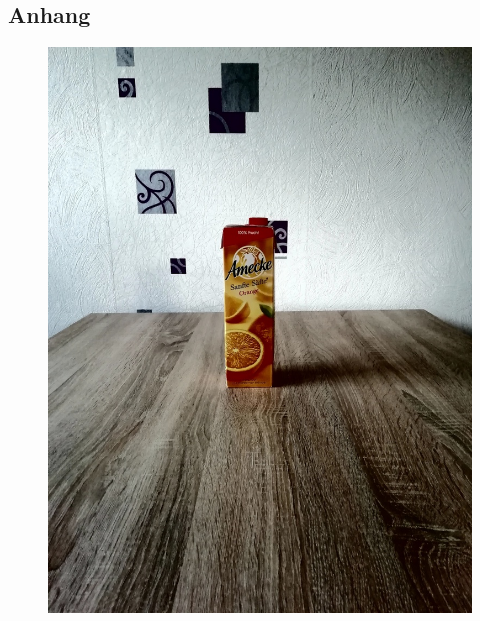 \begin{appendices}
\part*{Anhang}
\begin{figure}[htb]
\begin{minipage}[c]{0.2\textwidth}
\includegraphics[width=\textwidth]{Sources/Bild1_HA.jpg}
\end{minipage}
\hfill
\begin{minipage}[c]{0.08\textwidth}

\end{minipage}
\end{figure}
\end{appendices}
